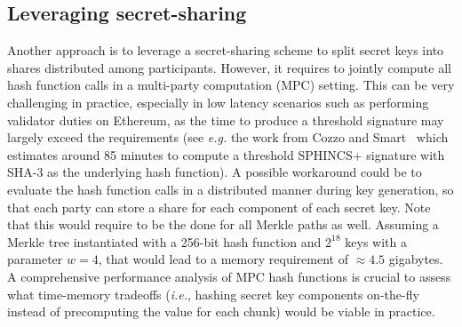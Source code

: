 \subsection{Leveraging secret-sharing}
Another approach is to leverage a secret-sharing scheme to split \WOTS secret keys into shares distributed among participants.
However, it requires to jointly compute all hash function calls in a multi-party computation (MPC) setting.
This can be very challenging in practice, especially in low latency scenarios such as performing validator duties on Ethereum, as the time to produce a threshold signature may largely exceed the requirements (see \textit{e.g.} the work from Cozzo and Smart~\cite{cryptoeprint:2019/1060} which estimates around 85 minutes to compute a threshold \textsf{SPHINCS+} signature with \textsf{SHA-3} as the underlying hash function).
A possible workaround could be to evaluate the hash function calls in a distributed manner during key generation, so that each party can store a share for each component of each \WOTS secret key.
Note that this would require to be the done for all Merkle paths as well.
Assuming a Merkle tree instantiated with a 256-bit hash function and $2^{18}$ \WOTS keys with a parameter $w = 4$, that would lead to a memory requirement of $\approx 4.5$ gigabytes.
A comprehensive performance analysis of MPC hash functions is crucial to assess what time-memory tradeoffs (\textit{i.e.}, hashing \WOTS secret key components on-the-fly instead of precomputing the value for each chunk) would be viable in practice.

%



 
